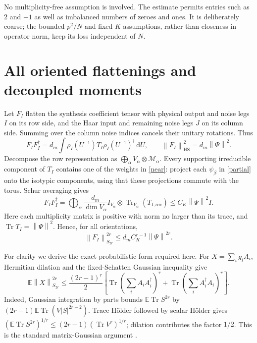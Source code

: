 \documentclass[11pt]{article}
\newcommand{\E}{\mathbb E}
\newcommand{\Tr}{\operatorname{Tr}}
\newcommand{\dd}{\mathrm d}
\newcommand{\norm}[1]{\left\lVert#1\right\rVert}
\begin{document}
No multiplicity-free assumption is involved. The estimate permits
entries such as $2$ and $-1$ as well as imbalanced numbers of zeroes
and ones. It is deliberately coarse; the bounded $p^2/N$ and fixed
$K$ assumptions, rather than closeness in operator norm, keep its
loss independent of $N$.

\newpage
\section{All oriented flattenings and decoupled moments}
Let $F_I$ flatten the synthesis coefficient tensor with physical
output and noise legs $I$ on its row side, and the Haar input and
remaining noise legs $J$ on its column side. Summing over the column
noise indices cancels their unitary rotations. Thus
\begin{equation}\label{frame}
 F_IF_I^\dagger=d_m\int\rho_I(U^{-1})T_I
                    \rho_I(U^{-1})^\dagger\,\dd U,
 \qquad \norm{F_I}_{\mathrm{HS}}^2=d_m\norm{\Psi}^2.
\end{equation}
Decompose the row representation as $\bigoplus_\alpha V_\alpha
\otimes\mathcal M_\alpha$. Every supporting irreducible component
of $T_I$ contains one of the weights in \eqref{near}: project each
$\psi_\beta$ in \eqref{partial} onto the isotypic components, using
that these projections commute with the torus. Schur averaging gives
\begin{equation}\label{schur}
 F_IF_I^\dagger=\bigoplus_\alpha\frac{d_m}{\dim V_\alpha}
 I_{V_\alpha}\otimes\Tr_{V_\alpha}(T_{I,\alpha\alpha})
 \le C_K\norm{\Psi}^2 I.
\end{equation}
Here each multiplicity matrix is positive with norm no larger than
its trace, and $\Tr T_I=\norm{\Psi}^2$. Hence, for all orientations,
\begin{equation}\label{flattenmom}
 \norm{F_I}_{S_{2r}}^{2r}
 \le d_m C_K^{r-1}\norm{\Psi}^{2r}.
\end{equation}

For clarity we derive the exact probabilistic form required here.
For $X=\sum_i g_i A_i$, Hermitian dilation and the fixed-Schatten
Gaussian inequality give
\begin{equation}\label{rect}
 \E\norm{X}_{S_{2r}}^{2r}\le\frac{(2r-1)^r}{2}
 \left[\Tr\left(\sum_i A_iA_i^\dagger\right)^r
       +\Tr\left(\sum_i A_i^\dagger A_i\right)^r\right].
\end{equation}
Indeed, Gaussian integration by parts bounds $\E\Tr S^{2r}$ by
$(2r-1)\E\Tr(V|S|^{2r-2})$. Trace H\"older followed by scalar
H\"older gives $(\E\Tr S^{2r})^{1/r}\le
(2r-1)(\Tr V^r)^{1/r}$; dilation contributes the factor $1/2$.
This is the standard matrix-Gaussian argument \cite{tropp}.
\end{document}
